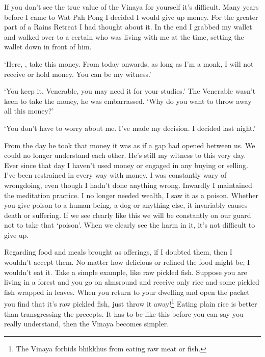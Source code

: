If you don't see the true value of the Vinaya for yourself it's difficult. Many years before I came to Wat Pah Pong I decided I would give up money. For the greater part of a Rains Retreat I had thought about it. In the end I grabbed my wallet and walked over to a certain  who was living with me at the time, setting the wallet down in front of him.

`Here, , take this money. From today onwards, as long as I'm a monk, I will not receive or hold money. You can be my witness.'

`You keep it, Venerable, you may need it for your studies.' The Venerable  wasn't keen to take the money, he was embarrassed. `Why do you want to throw away all this money?'

`You don't have to worry about me. I've made my decision. I decided last night.'

From the day he took that money it was as if a gap had opened between us. We could no longer understand each other. He's still my witness to this very day. Ever since that day I haven't used money or engaged in any buying or selling. I've been restrained in every way with money. I was constantly wary of wrongdoing, even though I hadn't done anything wrong. Inwardly I maintained the meditation practice. I no longer needed wealth, I saw it as a poison. Whether you give poison to a human being, a dog or anything else, it invariably causes death or suffering. If we see clearly like this we will be constantly on our guard not to take that `poison'. When we clearly see the harm in it, it's not difficult to give up.

Regarding food and meals brought as offerings, if I doubted them, then I wouldn't accept them. No matter how delicious or refined the food might be, I wouldn't eat it. Take a simple example, like raw pickled fish. Suppose you are living in a forest and you go on almsround and receive only rice and some pickled fish wrapped in leaves. When you return to your dwelling and open the packet you find that it's raw pickled fish, just throw it away!\footnote{The Vinaya forbids bhikkhus from eating raw meat or fish.} Eating plain rice is better than transgressing the precepts. It has to be like this before you can say you really understand, then the Vinaya becomes simpler.

